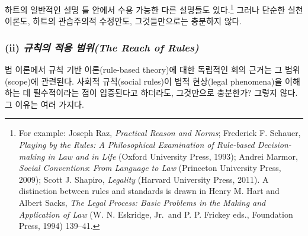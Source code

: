 \documentclass[12pt, oneside]{book}  %
\begin{document}
하트의 일반적인 설명 틀 안에서 수용 가능한 다른 설명들도
있다.\footnote{For example: Joseph Raz, \emph{Practical Reason and
  Norms}; Frederick F. Schauer, \emph{Playing by the Rules: A
  Philosophical Examination of Rule-based Decision-making in Law and in
  Life} (Oxford University Press, 1993); Andrei Marmor, \emph{Social
  Conventions}: \emph{From Language to Law} (Princeton University Press,
  2009); Scott J. Shapiro, \emph{Legality} (Harvard University Press,
  2011). A distinction between rules and standards is drawn in Henry M.
  Hart and Albert Sacks, \emph{The Legal Process: Basic Problems in the
  Making and Application of Law} (W. N. Eskridge, Jr.~and P. P. Frickey
  eds., Foundation Press, 1994) 139--41.} 그러나 단순한 실천 이론도,
하트의 관습주의적 수정안도, 그것들만으로는 충분하지 않다.

\subsubsection{\texorpdfstring{(ii) \emph{규칙의 적용 범위(The Reach of
Rules)}}{(ii) 규칙의 적용 범위(The Reach of Rules)}}\label{ii-uxaddcuxce59uxc758-uxc801uxc6a9-uxbc94uxc704the-reach-of-rules}

법 이론에서 규칙 기반 이론(rule-based theory)에 대한 독립적인 회의
근거는 그 범위(scope)에 관련된다. 사회적 규칙(social rules)이 법적
현상(legal phenomena)을 이해하는 데 필수적이라는 점이 입증된다고
하더라도, 그것만으로 충분한가? 그렇지 않다. 그 이유는 여러 가지다.
\end{document}
